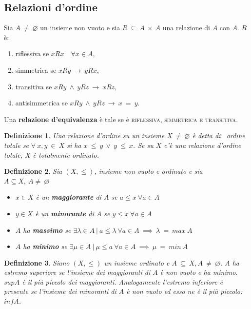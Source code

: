 \documentclass[12pt, a4paper]{article}
\theoremstyle{break}
\newtheorem{defn}{Definizione}
\theoremstyle{lemma}
\theoremstyle{lemma}
\theoremstyle{lemma}
\begin{document}
\subsection{Relazioni d'ordine}
Sia $A\ \neq\ \varnothing$ un insieme non vuoto e sia $R\ \subseteq\ A\ \times\ A$ una relazione di $A$ con $A$. $R$ è:

\begin{enumerate}
	\item riflessiva se $xRx \quad \forall x \in A$,
	\item simmetrica se $xRy\ \rightarrow\ yRx$,
	\item transitiva se $xRy\ \land\ yRz\ \rightarrow\ xRz$,
	\item antisimmetrica se $xRy\ \land\ yRz\ \rightarrow\ x\ =\ y$.
\end{enumerate}
Una \textbf{relazione d'equivalenza} è tale se è \textsc{riflessiva, simmetrica e transitiva}.

\begin{defn} 
 	Una relazione d'ordine su un insieme $X\ \neq \ \varnothing $ è detta di  \textit{ordine totale} se $\forall\ x,y\ \in\ X $ si ha $x\ \leq\ y\ \lor\ y\ \leq\ x$. Se su $X$ c'è una relazione d'ordine totale, $X$ è totalmente ordinato. 
\end{defn}

\begin{defn} Sia $(X,\leq)$, insieme non vuoto e ordinato e sia $A \subseteq X,\ A \neq\ \varnothing$
\begin{itemize}
	\item $x \in X$ è un \textbf{maggiorante} di $A$ se $a \leq x\ \forall a\in A$
	\item $y \in X$ è un \textbf{minorante} di $A$ se $y \leq x\ \forall a\in A$
	\item $A$ ha \textbf{massimo} se $\exists \lambda \in A\ |\ a \leq \lambda\ \forall a \in A\ \implies\ \lambda\ =\ max\ A$
	\item $A$ ha \textbf{minimo} se $\exists \mu \in A\ |\ \mu \leq a\ \forall a \in A\ \implies\ \mu\ =\ min\ A$
\end{itemize}
\end{defn}

\begin{defn} Siano $(X,\leq)$ un insieme ordinato e $A\ \subseteq\ X, A\ \neq\ \varnothing$. $A$ ha \textit{estremo superiore} se l'insieme dei maggioranti di $A$ è non vuoto e ha minimo. $sup A$ è il più piccolo dei maggioranti.
Analogamente \textit{l'estremo inferiore} è presente se l'insieme dei minoranti di $A$ è non vuoto ed esso ne è il più piccolo: $inf A$.
\end{defn}
\end{document}
